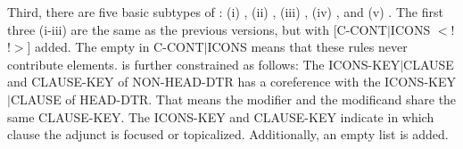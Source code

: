 
\noindent Third, there are five basic subtypes of
: (i) , (ii)
, (iii) , (iv)
, and (v)
. The first three (i-iii) are the same
as the previous versions, but with [C-CONT{$\mid$}ICONS
  \ensuremath{<}!  !\ensuremath{>}] added.  The empty 
in \mbox{C-CONT{$\mid$}ICONS} means that these rules never contribute
 elements.   is further
constrained as follows: The ICONS-KEY{$\mid$}CLAUSE and
CLAUSE-KEY of NON-HEAD-DTR has a coreference with the
ICONS-KEY{$\mid$}CLAUSE of HEAD-DTR. That
means the modifier and the modificand share the same CLAUSE-KEY. The
ICONS-KEY and CLAUSE-KEY indicate in which clause the adjunct is
focused or topicalized.  Additionally, an empty  list is
added.







